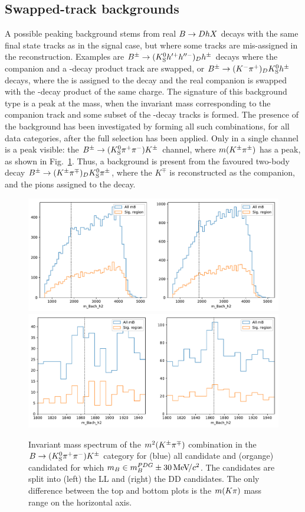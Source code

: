 
\subsection{Swapped-track backgrounds} %
\label{sub:swapped_track_backgrounds}

A possible peaking background stems from real ${B}\rightarrow{\ensuremath{D}} h X$ decays with the same final state tracks as in the signal case, but where some tracks are mis-assigned in the reconstruction. Examples are ${{B}^\pm}\rightarrow({{K}^0_{\mathrm{S}}} h'^+h''^-)_Dh^\pm$ decays where the companion and a \D-decay product track are swapped, or ${{B}^\pm}\rightarrow(K^-{{\pi}^+})_D {{K}^0_{\mathrm{S}}} h^\pm$ decays, where the \KS is assigned to the \D decay and the real companion is swapped with the \D-decay product of the same charge. 
The signature of this background type is a peak at the \D mass, when the invariant mass corresponding to the companion track and some subset of the \D-decay tracks is formed. The presence of the background has been investigated by forming all such combinations, for all data categories, after the full selection has been applied. Only in a single channel is a peak visible: the ${{B}^\pm}\rightarrow({{K}^0_{\mathrm{S}}}{{\pi}^+}{{\pi}^-}){{K}^\pm}$ channel, where $m({{K}^\pm}{{\pi}^\pm})$ has a peak, as shown in Fig.~\ref{fig:swapped_backgrounds}. Thus, a background is present from the favoured two-body \D decay ${{B}^\pm}\rightarrow(K^\pm{\ensuremath{{\pi}^\mp}})_D {{K}^0_{\mathrm{S}}} {{\pi}^\pm}$, where the $K^\mp$ is reconstructed as the companion, and the pions assigned to the \D decay. 

\begin{figure}[tbp]
    \centering
    \includegraphics[width=0.7\columnwidth]{figures/analysis/swapped_background/swapped_tracks_K_PiPi_DD_Bach-h2_None_None.pdf}
    \includegraphics[width=0.7\columnwidth]{figures/analysis/swapped_background/swapped_tracks_K_PiPi_DD_Bach-h2_1800_1950.pdf}
    \caption{Invariant mass spectrum of the $m^2({{K}^\pm}{{\pi}^\mp})$ combination in the ${B}\rightarrow({{K}^0_{\mathrm{S}}}{{\pi}^+}{{\pi}^-}){{K}^\pm}$ category for (blue) all candidate and (organge) candidated for which $m_B\in m_B^{PDG}\pm30\text{\,Me\kern -0.1em V\!/}c^2$. The candidates are split into (left) the LL and (right) the DD candidates. The only difference between the top and bottom plots is the $m({K}\pi)$ mass range on the horizontal axis.}
    \label{fig:swapped_backgrounds}
\end{figure}

